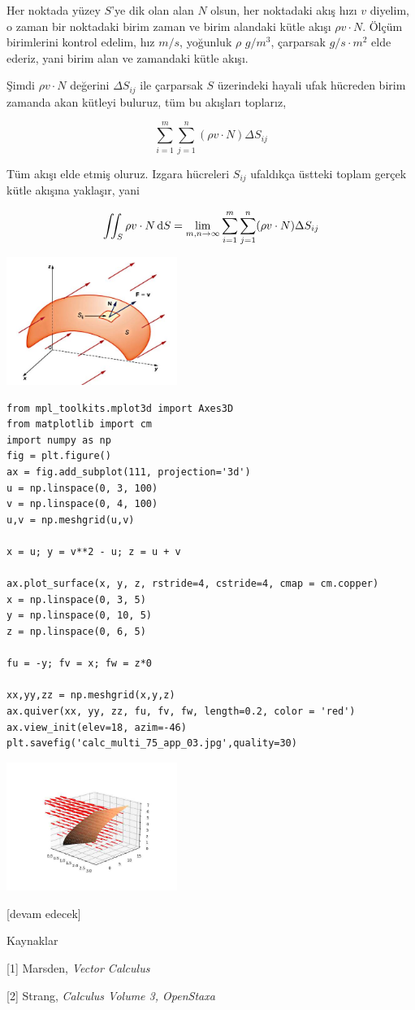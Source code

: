 \documentclass[12pt,fleqn]{article}\usepackage{../../common}
\begin{document}
Her noktada yüzey $S$'ye dik olan alan $N$ olsun, her noktadaki akış hızı $v$
diyelim, o zaman bir noktadaki birim zaman ve birim alandaki kütle akışı $\rho v
\cdot N$. Ölçüm birimlerini kontrol edelim, hız $m/s$, yoğunluk $\rho$ 
$g/m^3$, çarparsak $g/s \cdot m^2$ elde ederiz, yani birim alan ve zamandaki
kütle akışı.

Şimdi $\rho v \cdot N$ değerini $\Delta S_{ij}$ ile çarparsak $S$ üzerindeki
hayali ufak hücreden birim zamanda akan kütleyi buluruz, tüm bu akışları
toplarız,

$$
\sum_{i=1}^{m} \sum_{j=1}^{n} (\rho v \cdot N) \Delta S_{ij}
$$

Tüm akışı elde etmiş oluruz. Izgara hücreleri $S_{ij}$ ufaldıkça üstteki toplam
gerçek kütle akışına yaklaşır, yani

$$
\iint_S \rho v \cdot N \,\mathrm{d} S = \lim_{m,n \to \infty}
\sum_{i=1}^{m} \sum_{j=1}^{n} (\rho v \cdot N) \Delta S_{ij}
$$

\includegraphics[width=15em]{calc_multi_75_app_05.jpg}

\begin{verbatim}
from mpl_toolkits.mplot3d import Axes3D
from matplotlib import cm
import numpy as np
fig = plt.figure()
ax = fig.add_subplot(111, projection='3d')
u = np.linspace(0, 3, 100)
v = np.linspace(0, 4, 100)
u,v = np.meshgrid(u,v)

x = u; y = v**2 - u; z = u + v

ax.plot_surface(x, y, z, rstride=4, cstride=4, cmap = cm.copper)
x = np.linspace(0, 3, 5)
y = np.linspace(0, 10, 5)
z = np.linspace(0, 6, 5)

fu = -y; fv = x; fw = z*0

xx,yy,zz = np.meshgrid(x,y,z)
ax.quiver(xx, yy, zz, fu, fv, fw, length=0.2, color = 'red')
ax.view_init(elev=18, azim=-46)
plt.savefig('calc_multi_75_app_03.jpg',quality=30)
\end{verbatim}

\includegraphics[width=15em]{calc_multi_75_app_03.jpg}















[devam edecek]

Kaynaklar

[1] Marsden, {\em Vector Calculus}

[2] Strang, {\em Calculus Volume 3, OpenStaxa}
\end{document}
